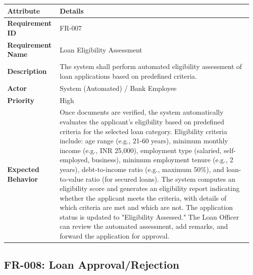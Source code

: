\documentclass[12pt,a4paper,oneside]{report}
\begin{document}
\begin{table}[htbp]
\centering
\small
\begin{tabularx}{\textwidth}{l l}
\toprule
\textbf{Attribute} & \textbf{Details} \\
\midrule
\textbf{Requirement ID} & FR-007 \\
\textbf{Requirement Name} & Loan Eligibility Assessment \\
\textbf{Description} & The system shall perform automated eligibility assessment of loan applications based on predefined criteria. \\
\textbf{Actor} & System (Automated) / Bank Employee \\
\textbf{Priority} & High \\
\textbf{Expected Behavior} & Once documents are verified, the system automatically evaluates the applicant's eligibility based on predefined criteria for the selected loan category. Eligibility criteria include: age range (e.g., 21-60 years), minimum monthly income (e.g., INR 25,000), employment type (salaried, self-employed, business), minimum employment tenure (e.g., 2 years), debt-to-income ratio (e.g., maximum 50\%), and loan-to-value ratio (for secured loans). The system computes an eligibility score and generates an eligibility report indicating whether the applicant meets the criteria, with details of which criteria are met and which are not. The application status is updated to "Eligibility Assessed." The Loan Officer can review the automated assessment, add remarks, and forward the application for approval. \\
\bottomrule
\end{tabularx}
\end{table}

\subsection{FR-008: Loan Approval/Rejection}
\end{document}
